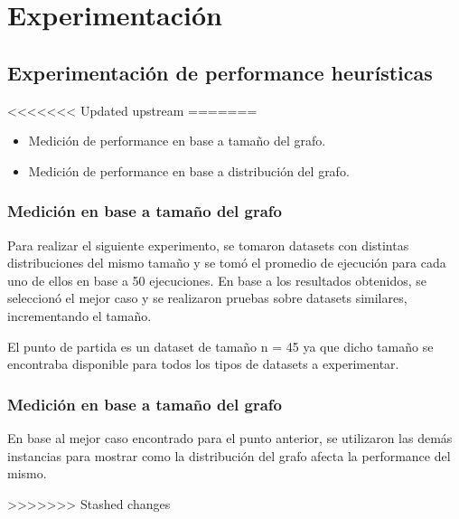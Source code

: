 \section{Experimentación}

\subsection{Experimentación de performance heurísticas}








<<<<<<< Updated upstream
=======
\begin{itemize}
\item Medición de performance en base a tamaño del grafo.
\item Medición de performance en base a distribución del grafo.
\end{itemize}

\subsubsection{Medición en base a tamaño del grafo}
Para realizar el siguiente experimento, se tomaron datasets con distintas distribuciones del mismo tamaño y se tomó el promedio de ejecución para cada uno de ellos en base a 50 ejecuciones. En base a los resultados obtenidos, se seleccionó el mejor caso y se realizaron pruebas sobre datasets similares, incrementando el tamaño.

\vskip 8pt

El punto de partida es un dataset de tamaño n = 45 ya que dicho tamaño se encontraba disponible para todos los tipos de datasets a experimentar.

\subsubsection{Medición en base a tamaño del grafo}
En base al mejor caso encontrado para el punto anterior, se utilizaron las demás instancias para mostrar como la distribución del grafo afecta la performance del mismo.



>>>>>>> Stashed changes
